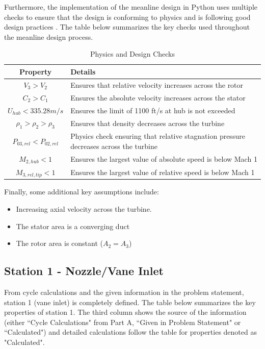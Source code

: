 \documentclass[12pt, letter]{report}
\begin{document}
Furthermore, the implementation of the meanline design in Python uses multiple checks to ensure that the design is conforming to physics and is following good design practices \cite{farokhi2022}. The table below summarizes the key checks used throughout the meanline design process.\par

\begin{table}[H]
\caption{Physics and Design Checks}
\centering
\begin{tabular}{|c|p{}|}
\hline
\textbf{Property}  & \textbf{Details}\\ \hline
$V_3 > V_2$ &  Ensures that relative velocity increases across the rotor\\ \hline
$C_2 > C_1$ & Ensures the absolute velocity increases across the stator\\ \hline
$U_{hub} < 335.28 m/s$ & Ensures the limit of 1100 ft/s at hub is not exceeded \\ \hline
$\rho_1 > \rho_2 > \rho_3$ & Ensures that density decreases across the turbine \\ \hline
$P_{03,rel} < P_{02,rel}$ & Physics check ensuring that relative stagnation pressure decreases across the turbine \\ \hline
$M_{2,hub} < 1$ & Ensures the largest value of absolute speed is below Mach 1 \\ \hline
$M_{3,rel,tip} < 1$ & Ensures the largest value of relative speed is below Mach 1 \\ \hline
\end{tabular}
\label{tab:my_label}
\end{table}
\par

Finally, some additional key assumptions include:
\begin{itemize}
    \item  Increasing axial velocity across the turbine.
    \item  The stator area is a converging duct
    \item  The rotor area is constant ($A_2 = A_3$)
\end{itemize}

\subsection{Station 1 - Nozzle/Vane Inlet}
From cycle calculations and the given information in the problem statement, station 1 (vane inlet) is completely defined. The table below summarizes the key properties of station 1. The third column shows the source of the information (either ``Cycle Calculations" from Part A, ``Given in Problem Statement" or ``Calculated") and detailed calculations follow the table for properties denoted as "Calculated". \par
\end{document}
